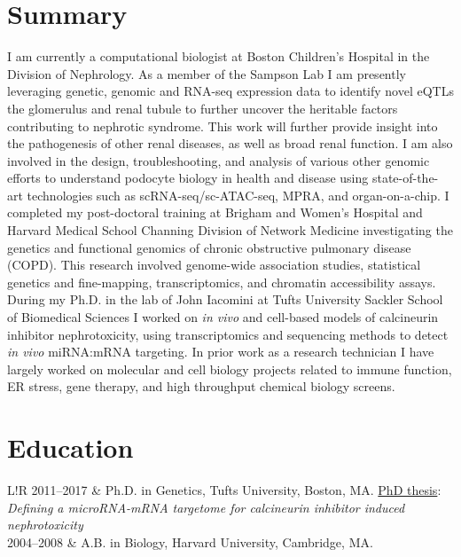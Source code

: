 \documentclass[letterpaper, 10pt]{article}
\newcommand\VRule{\color{lightgray}\vrule width 0.5pt}
\begin{document}
\section*{Summary}

I am currently a computational biologist at Boston Children's Hospital in the Division of Nephrology. As a member of the Sampson Lab I am presently leveraging genetic, genomic and RNA-seq expression data to identify novel eQTLs the glomerulus and renal tubule to further uncover the heritable factors contributing to nephrotic syndrome. This work will further provide insight into the pathogenesis of other renal diseases, as well as broad renal function. I am also involved in the design, troubleshooting, and analysis of various other genomic efforts to understand podocyte biology in health and disease using state-of-the-art technologies such as scRNA-seq/sc-ATAC-seq, MPRA, and organ-on-a-chip. I completed my post-doctoral training at Brigham and Women's Hospital and Harvard Medical School Channing Division of Network Medicine investigating the genetics and functional genomics of chronic obstructive pulmonary disease (COPD). This research involved genome-wide association studies, statistical genetics and fine-mapping, transcriptomics, and chromatin accessibility assays.  During my Ph.D. in the lab of John Iacomini at Tufts University Sackler School of Biomedical Sciences I worked on \textit{in vivo} and cell-based models of calcineurin inhibitor nephrotoxicity, using transcriptomics and sequencing methods to detect \textit{in vivo} miRNA:mRNA targeting. In prior work as a research technician I have largely worked on molecular and cell biology projects related to immune function, ER stress, gene therapy, and high throughput chemical biology screens. 

\section*{Education}
\begin{tabular}{L!{\VRule}R}
   2011--2017 & Ph.D. in Genetics, Tufts University, Boston, MA. \href{https://github.com/cbenway/cv/blob/master/phd_thesis.pdf}{PhD thesis}: \textit{Defining a microRNA-mRNA targetome for calcineurin inhibitor induced nephrotoxicity}\\
   2004--2008 & A.B. in Biology, Harvard University, Cambridge, MA.
\end{tabular}
\end{document}
